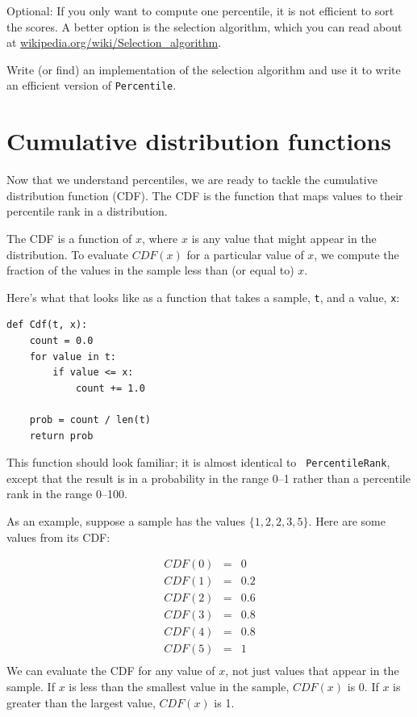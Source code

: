 \documentclass[12pt]{book}
\begin{document}
\begin{ex}

Optional: If you only want to compute one percentile, it is not
efficient to sort the scores.  A better option is the selection
algorithm, which you can read about at
\url{wikipedia.org/wiki/Selection_algorithm}.


Write (or find) an implementation of the selection algorithm and use
it to write an efficient version of {\tt Percentile}.

\end{ex}


\section{Cumulative distribution functions}


Now that we understand percentiles, we are ready to tackle the
cumulative distribution function (CDF).  The CDF is the function that
maps values to their percentile rank in a distribution.

The CDF is a function of $x$, where $x$ is any value that might appear
in the distribution.  To evaluate $CDF(x)$ for a particular value of
$x$, we compute the fraction of the values in the sample less than (or
equal to) $x$.

Here's what that looks like as a function that takes a sample,
{\tt t}, and a value, {\tt x}:

\begin{verbatim}
def Cdf(t, x):
    count = 0.0
    for value in t:
        if value <= x:
            count += 1.0

    prob = count / len(t)
    return prob
\end{verbatim}

This function should look familiar; it is almost identical to {\tt
  PercentileRank}, except that the result is in a probability in the
range 0--1 rather than a percentile rank in the range 0--100.

As an example, suppose a sample has the values $\{1, 2, 2, 3, 5\}$.
Here are some values from its CDF:

\begin{eqnarray*}
CDF(0) &=& 0    \\
CDF(1) &=& 0.2    \\
CDF(2) &=& 0.6    \\
CDF(3) &=& 0.8    \\
CDF(4) &=& 0.8    \\
CDF(5) &=& 1    \\
\end{eqnarray*}
%
We can evaluate the CDF for any value of $x$, not just
values that appear in the sample.
If $x$ is less than the smallest value in the sample, $CDF(x)$ is 0.
If $x$ is greater than the largest value, $CDF(x)$ is 1.
\end{document}
